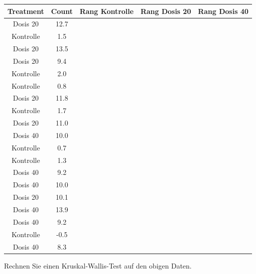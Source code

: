 \documentclass[a4paper, 10pt]{scrartcl}\usepackage[]{graphicx}\usepackage[]{xcolor}
\newenvironment{knitrout}{}{} %
\begin{document}
\begin{knitrout}
\color{fgcolor}\begin{table}[!h]
\centering
\begin{tabular}{ccccc}
\toprule
Treatment & Count & Rang Kontrolle & Rang Dosis 20 & Rang Dosis 40\\
\midrule
Dosis 20 & 12.7 &  &  & \\
Kontrolle & 1.5 &  &  & \\
Dosis 20 & 13.5 &  &  & \\
Dosis 20 & 9.4 &  &  & \\
Kontrolle & 2.0 &  &  & \\
\addlinespace
Kontrolle & 0.8 &  &  & \\
Dosis 20 & 11.8 &  &  & \\
Kontrolle & 1.7 &  &  & \\
Dosis 20 & 11.0 &  &  & \\
Dosis 40 & 10.0 &  &  & \\
\addlinespace
Kontrolle & 0.7 &  &  & \\
Kontrolle & 1.3 &  &  & \\
Dosis 40 & 9.2 &  &  & \\
Dosis 40 & 10.0 &  &  & \\
Dosis 20 & 10.1 &  &  & \\
\addlinespace
Dosis 40 & 13.9 &  &  & \\
Dosis 40 & 9.2 &  &  & \\
Kontrolle & -0.5 &  &  & \\
Dosis 40 & 8.3 &  &  & \\
\bottomrule
\end{tabular}
\end{table}

\end{knitrout}

Rechnen Sie einen Kruskal-Wallis-Test auf den obigen Daten.
\end{document}
